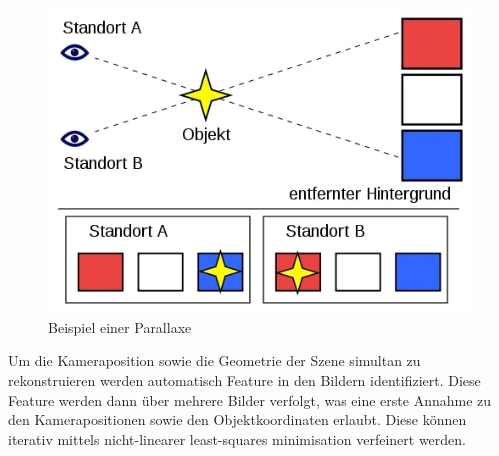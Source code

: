 \begin{figure}
    \centering
    \includegraphics[width=\textwidth]{src/img/500px-Parallax_Example_de.svg.jpg}
    \caption{Beispiel einer Parallaxe~\cite{wiki:parallax_example_de}}
    \label{fig:theory-sfm-parallax}
\end{figure}

Um die Kameraposition sowie die Geometrie der Szene simultan zu rekonstruieren werden automatisch Feature in den Bildern identifiziert.
Diese Feature werden dann über mehrere Bilder verfolgt, was eine erste Annahme zu den Kamerapositionen sowie den Objektkoordinaten erlaubt.
Diese können iterativ mittels nicht-linearer least-squares minimisation verfeinert werden. ~\cite[Kapitel 1.3]{westoby_2012}

